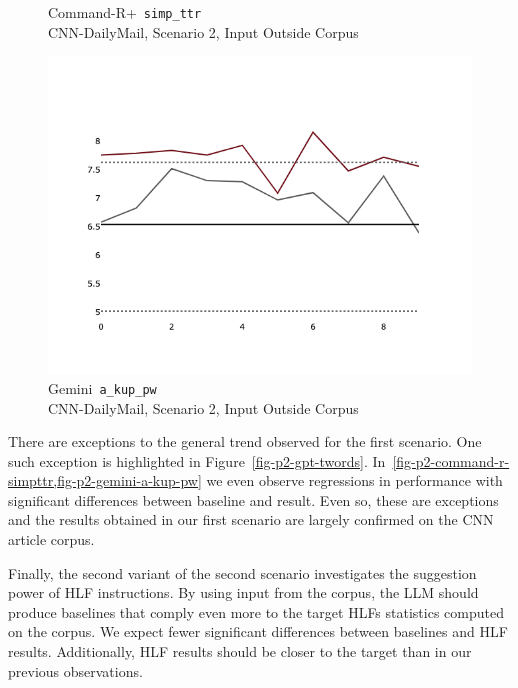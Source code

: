 \documentclass[a4paper,twoside]{article}
\begin{document}
\begin{figure}[ht!]
\begin{minipage}{0.32\textwidth}
        \caption{Command-R+~\texttt{simp\_ttr}\\CNN-DailyMail, Scenario 2, Input Outside Corpus}\label{fig-p2-command-r-simpttr}
    \end{minipage}
    \hfill
    \begin{minipage}{0.32\textwidth}
        \includegraphics[width=\linewidth]{plots/prompt_2/prompt_2-gemini-cnn_dailymail/prompt_2-gemini-cnn_dailymail_a_kup_pw.png}
        \caption[center]{Gemini~\texttt{a\_kup\_pw}\\CNN-DailyMail, Scenario 2, Input Outside Corpus}\label{fig-p2-gemini-a-kup-pw}
    \end{minipage}
\end{figure}

There are exceptions to the general trend observed for the first scenario.
One such exception is highlighted in Figure~\ref{fig-p2-gpt-twords}.
In~\cref{fig-p2-command-r-simpttr,fig-p2-gemini-a-kup-pw} we even observe
regressions in performance with significant differences between baseline and
result.
Even so, these are exceptions and the results obtained in our first scenario are
largely confirmed on the CNN article corpus.

Finally, the second variant of the second scenario investigates the suggestion
power of HLF instructions.
By using input from the corpus, the LLM should produce baselines that comply
even more to the target HLFs statistics computed on the corpus.
We expect fewer significant differences between baselines and HLF results.
Additionally, HLF results should be closer to the target than in our previous
observations.
\end{document}
